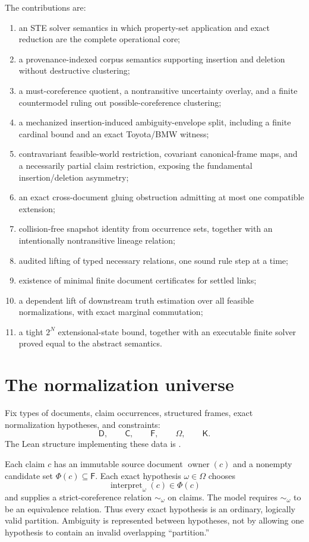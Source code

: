\documentclass[11pt]{article}
\theoremstyle{definition}
\theoremstyle{remark}
\newcommand{\Hyp}{\Omega}
\newcommand{\Docs}{\mathsf D}
\newcommand{\Claims}{\mathsf C}
\newcommand{\Frames}{\mathsf F}
\newcommand{\Constraints}{\mathsf K}
\begin{document}
The contributions are:
\begin{enumerate}
  \item an STE solver semantics in which property-set application and exact
        reduction are the complete operational core;
  \item a provenance-indexed corpus semantics supporting insertion and
        deletion without destructive clustering;
  \item a must-coreference quotient, a nontransitive uncertainty overlay, and
        a finite countermodel ruling out possible-coreference clustering;
  \item a mechanized insertion-induced ambiguity-envelope split, including a
        finite cardinal bound and an exact Toyota/BMW witness;
  \item contravariant feasible-world restriction, covariant canonical-frame
        maps, and a necessarily partial claim restriction, exposing the
        fundamental insertion/deletion asymmetry;
  \item an exact cross-document gluing obstruction admitting at most one
        compatible extension;
  \item collision-free snapshot identity from occurrence sets, together with
        an intentionally nontransitive lineage relation;
  \item audited lifting of typed necessary relations, one sound rule step at
        a time;
  \item existence of minimal finite document certificates for settled links;
  \item a dependent lift of downstream truth estimation over all feasible
        normalizations, with exact marginal commutation;
  \item a tight $2^N$ extensional-state bound, together with an executable
        finite solver proved equal to the abstract semantics.
\end{enumerate}

\section{The normalization universe}

Fix types of documents, claim occurrences, structured frames, exact
normalization hypotheses, and constraints:
\[
  \Docs,\qquad \Claims,\qquad \Frames,\qquad
  \Hyp,\qquad \Constraints.
\]
The Lean structure implementing these data is
.

Each claim $c$ has an immutable source document $\operatorname{owner}(c)$ and a
nonempty candidate set $\Phi(c)\subseteq\Frames$.  Each exact hypothesis
$\omega\in\Hyp$ chooses
\[
  \operatorname{interpret}_{\omega}(c)\in\Phi(c)
\]
and supplies a strict-coreference relation $\sim_{\omega}$ on claims.  The
model requires $\sim_{\omega}$ to be an equivalence relation.  Thus every exact
hypothesis is an ordinary, logically valid partition.  Ambiguity is represented
between hypotheses, not by allowing one hypothesis to contain an invalid
overlapping ``partition.''
\end{document}

